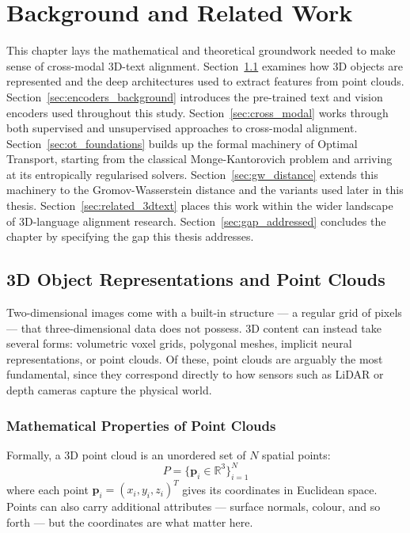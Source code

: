 \chapter{Background and Related Work}
\label{ch:background}

This chapter lays the mathematical and theoretical groundwork needed to make sense of cross-modal 3D-text alignment. Section~\ref{sec:3d_representations} examines how 3D objects are represented and the deep architectures used to extract features from point clouds. Section~\ref{sec:encoders_background} introduces the pre-trained text and vision encoders used throughout this study. Section~\ref{sec:cross_modal} works through both supervised and unsupervised approaches to cross-modal alignment. Section~\ref{sec:ot_foundations} builds up the formal machinery of Optimal Transport, starting from the classical Monge-Kantorovich problem and arriving at its entropically regularised solvers. Section~\ref{sec:gw_distance} extends this machinery to the Gromov-Wasserstein distance and the variants used later in this thesis. Section~\ref{sec:related_3dtext} places this work within the wider landscape of 3D-language alignment research. Section~\ref{sec:gap_addressed} concludes the chapter by specifying the gap this thesis addresses.

\section{3D Object Representations and Point Clouds}
\label{sec:3d_representations}

Two-dimensional images come with a built-in structure --- a regular grid of pixels --- that three-dimensional data does not possess. 3D content can instead take several forms: volumetric voxel grids, polygonal meshes, implicit neural representations, or point clouds. Of these, point clouds are arguably the most fundamental, since they correspond directly to how sensors such as LiDAR or depth cameras capture the physical world.

\subsection{Mathematical Properties of Point Clouds}
\label{subsec:point_cloud_properties}

Formally, a 3D point cloud is an unordered set of $N$ spatial points:
\begin{equation}
    P = \{\mathbf{p}_i \in \mathbb{R}^3\}_{i=1}^N
\end{equation}
where each point $\mathbf{p}_i = (x_i, y_i, z_i)^T$ gives its coordinates in Euclidean space. Points can also carry additional attributes --- surface normals, colour, and so forth --- but the coordinates are what matter here.

